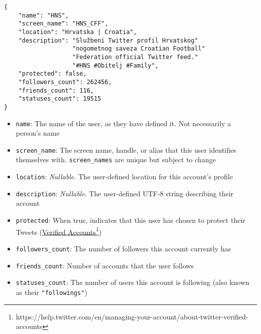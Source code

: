 \begin{code}
\label{subsubsec:sdlc-analysis-data-source:ingest-user}
\begin{verbatim}
{
    "name": "HNS",
    "screen_name": "HNS_CFF",
    "location": "Hrvatska | Croatia",
    "description": "Službeni Twitter profil Hrvatskog"
                   "nogometnog saveza Croatian Football"
                   "Federation official Twitter feed."
                   "#HNS #Obitelj #Family",
    "protected": false,
    "followers_count": 262456,
    "friends_count": 116,
    "statuses_count": 19515
}
\end{verbatim}
\end{code}

\begin{itemize}
    \item \texttt{name}: The name of the user, as they have defined it. Not necessarily a person's name
    \item \texttt{screen\_name}: The screen name, handle, or alias that this user identifies themselves with. \texttt{screen\_names} are unique but subject to change
    \item \texttt{location}: \textit{Nullable}. The user-defined location for this account's profile
    \item \texttt{description}: \textit{Nullable}. The user-defined UTF-8 string describing their account
    \item \texttt{protected}: When true, indicates that this user has chosen to protect their Tweets (\href{https://help.twitter.com/en/managing-your-account/about-twitter-verified-accounts}{Verified Accounts}\footnote{https://help.twitter.com/en/managing-your-account/about-twitter-verified-accounts})
    \item \texttt{followers\_count}: The number of followers this account currently has
    \item \texttt{friends\_count}: Number of accounts that the user follows
    \item \texttt{statuses\_count}: The number of users this account is following (also known as their \texttt{"followings"})
\end{itemize}
